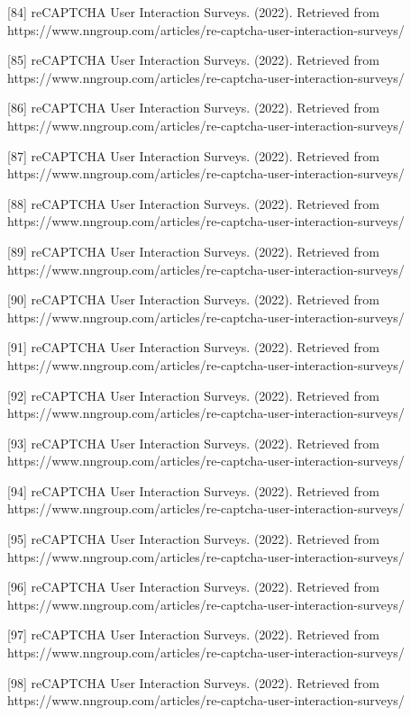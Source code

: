 [84] reCAPTCHA User Interaction Surveys. (2022). Retrieved from https://www.nngroup.com/articles/re-captcha-user-interaction-surveys/ 

[85] reCAPTCHA User Interaction Surveys. (2022). Retrieved from https://www.nngroup.com/articles/re-captcha-user-interaction-surveys/ 

[86] reCAPTCHA User Interaction Surveys. (2022). Retrieved from https://www.nngroup.com/articles/re-captcha-user-interaction-surveys/ 

[87] reCAPTCHA User Interaction Surveys. (2022). Retrieved from https://www.nngroup.com/articles/re-captcha-user-interaction-surveys/ 

[88] reCAPTCHA User Interaction Surveys. (2022). Retrieved from https://www.nngroup.com/articles/re-captcha-user-interaction-surveys/ 

[89] reCAPTCHA User Interaction Surveys. (2022). Retrieved from https://www.nngroup.com/articles/re-captcha-user-interaction-surveys/ 

[90] reCAPTCHA User Interaction Surveys. (2022). Retrieved from https://www.nngroup.com/articles/re-captcha-user-interaction-surveys/ 

[91] reCAPTCHA User Interaction Surveys. (2022). Retrieved from https://www.nngroup.com/articles/re-captcha-user-interaction-surveys/ 

[92] reCAPTCHA User Interaction Surveys. (2022). Retrieved from https://www.nngroup.com/articles/re-captcha-user-interaction-surveys/ 

[93] reCAPTCHA User Interaction Surveys. (2022). Retrieved from https://www.nngroup.com/articles/re-captcha-user-interaction-surveys/ 

[94] reCAPTCHA User Interaction Surveys. (2022). Retrieved from https://www.nngroup.com/articles/re-captcha-user-interaction-surveys/ 

[95] reCAPTCHA User Interaction Surveys. (2022). Retrieved from https://www.nngroup.com/articles/re-captcha-user-interaction-surveys/ 

[96] reCAPTCHA User Interaction Surveys. (2022). Retrieved from https://www.nngroup.com/articles/re-captcha-user-interaction-surveys/ 

[97] reCAPTCHA User Interaction Surveys. (2022). Retrieved from https://www.nngroup.com/articles/re-captcha-user-interaction-surveys/ 

[98] reCAPTCHA User Interaction Surveys. (2022). Retrieved from https://www.nngroup.com/articles/re-captcha-user-interaction-surveys/ 

